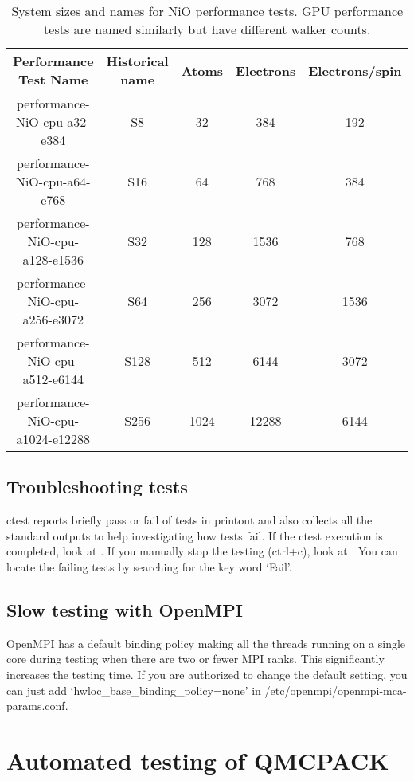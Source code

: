 \begin{table}[h]
\begin{center}
\begin{tabular}{|c|c|c|c|c|}
\hline
\bfseries Performance Test Name&  \bfseries Historical name &\bfseries Atoms& \bfseries Electrons&  \bfseries Electrons/spin \\
\hline
performance-NiO-cpu-a32-e384  & S8 & 32 & 384 & 192 \\
performance-NiO-cpu-a64-e768  & S16 & 64 & 768 & 384 \\
performance-NiO-cpu-a128-e1536 & S32 & 128 & 1536 & 768 \\
performance-NiO-cpu-a256-e3072 & S64 & 256 & 3072 & 1536 \\
performance-NiO-cpu-a512-e6144 & S128 & 512 & 6144 & 3072 \\
performance-NiO-cpu-a1024-e12288& S256 & 1024 & 12288 & 6144 \\
\hline
\end{tabular}
  \caption{System sizes and names for NiO performance tests. GPU performance
    tests are named similarly but have different walker counts.}
  \label{tab:niotests}
\end{center}
\end{table}

\subsection{Troubleshooting tests}
ctest reports briefly pass or fail of tests in printout and also collects all the standard outputs to help investigating how tests fail.
If the ctest execution is completed, look at .
If you manually stop the testing (ctrl+c), look at .
You can locate the failing tests by searching for the key word `Fail'.

\subsection{Slow testing with OpenMPI}
OpenMPI has a default binding policy making all the threads running on a single core during testing when there are two or fewer MPI ranks.
This significantly increases the testing time. If you are authorized to change the default setting, you can just add `hwloc\_base\_binding\_policy=none' in /etc/openmpi/openmpi-mca-params.conf.

\section{Automated testing of QMCPACK}

